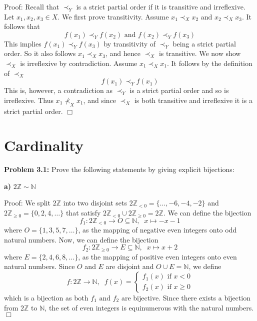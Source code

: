 \documentclass[11pt]{article}
\begin{document}
Proof: Recall that $\prec_Y$ is a strict partial order if it is transitive and irreflexive. Let $x_1, x_2, x_3 \in X$. We first prove transitivity. Assume $x_1 \prec_X x_2 \text{ and } x_2 \prec_X x_3$. It follows that 
\begin{equation*}
    f(x_1) \prec_Y f(x_2) \text{ and } f(x_2) \prec_Y f(x_3)   
\end{equation*}
This implies $f(x_1) \prec_Y f(x_3)$ by transitivity of $\prec_Y$ being a strict partial order. So it also follows $x_1 \prec_X x_3$, and hence $\prec_X$ is transitive. We now show $\prec_X$ is irreflexive by contradiction. Assume $x_1 \prec_X x_1$. It follows by the definition of $\prec_X$
\begin{equation*}
    f(x_1) \prec_Y f(x_1)
\end{equation*}
This is, however, a contradiction as $\prec_Y$ is a strict partial order and so is irreflexive. Thus $x_1 \nprec_X x_1$, and since $\prec_X$ is both transitive and irreflexive it is a strict partial order. $\Box$

\section{Cardinality}

\textbf{Problem 3.1:} Prove the following statements by giving explicit bijections:

\textbf{a)} $2 \mathbb{Z} \sim \mathbb{N}$

Proof: We split $2 \mathbb{Z}$ into two disjoint sets $2\mathbb{Z}_{< 0} = \{\dots, -6, -4, -2\}$ and $2\mathbb{Z}_{\geq 0} = \{0, 2, 4, \dots\}$ that satisfy $2 \mathbb{Z}_{< 0} \cup 2 \mathbb{Z}_{\geq 0} = 2 \mathbb{Z}$. We can define the bijection 
\begin{equation*}
    f_1 : 2\mathbb{Z}_{< 0} \rightarrow O \subseteq \mathbb{N}, \; \; x \mapsto -x - 1
\end{equation*}
where $O = \{1, 3, 5, 7, \dots\}$, as the mapping of negative even integers onto odd natural numbers. Now, we can define the bijection
\begin{equation*}
    f_2 : 2\mathbb{Z}_{\geq 0} \rightarrow E \subseteq \mathbb{N}, \; \; x \mapsto x + 2
\end{equation*}
where $E = \{2, 4, 6, 8, \dots\}$, as the mapping of positive even integers onto even natural numbers. Since $O$ and $E$ are disjoint and $O \cup E = \mathbb{N}$, we define 
\begin{equation*}
    f : 2 \mathbb{Z} \rightarrow \mathbb{N}, \; \; f(x) = 
    \begin{cases} 
        f_1(x) \text{   if } x < 0 \\ 
        f_2(x) \text{   if } x \geq 0 
    \end{cases}
\end{equation*}
which is a bijection as both $f_1 \text{ and } f_2$ are bijective. Since there exists a bijection from $2 \mathbb{Z}$ to $\mathbb{N}$, the set of even integers is equinumerous with the natural numbers. $\Box$
\end{document}
